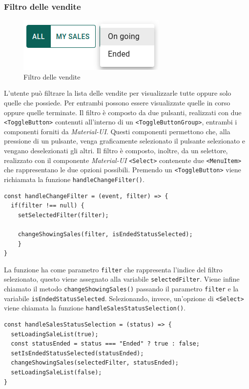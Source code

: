 \documentclass[a4paper]{article}
\begin{document}
        \subsubsection{Filtro delle vendite}
        \begin{figure}[ht]
          \includegraphics[scale=0.7]{saleFilter.png}
          \centering
          \caption{Filtro delle vendite}
          \centering
          \label{fig:salesFilter}
        \end{figure}
        L'utente può filtrare la lista delle vendite per visualizzarle tutte oppure solo quelle che possiede. Per entrambi possono essere visualizzate quelle in corso oppure quelle terminate.
        Il filtro è composto da due pulsanti, realizzati con due \verb|<ToggleButton>| contenuti all'interno di un \verb|<ToggleButtonGroup>|, entrambi i componenti forniti da \emph{Material-UI}. Questi componenti permettono che, alla pressione di un pulsante, venga graficamente selezionato il pulsante selezionato e vengano deselezionati gli altri.
        Il filtro è composto, inoltre, da un selettore, realizzato con il componente \emph{Material-UI} \verb|<Select>| contenente due \verb|<MenuItem>| che rappresentano le due opzioni possibili.
        Premendo un \verb|<ToggleButton>| viene richiamata la funzione \verb|handleChangeFilter()|.
\begin{lstlisting}[style=ES6, title={Funzione handleChangeFilter()}]
const handleChangeFilter = (event, filter) => {
  if(filter !== null) { 
    setSelectedFilter(filter);

    changeShowingSales(filter, isEndedStatusSelected);
    }
}\end{lstlisting}
        La funzione ha come parametro \verb|filter| che rappresenta l'indice del filtro selezionato, questo viene assegnato alla variabile \verb|selectedFilter|.
        Viene infine chiamato il metodo \verb|changeShowingSales()| passando il parametro \verb|filter| e la variabile \verb|isEndedStatusSelected|.
        \newline
        Selezionando, invece, un'opzione di \verb|<Select>| viene chiamata la funzione \verb|handleSalesStatusSelection()|.
\begin{lstlisting}[style=ES6, title={Funzione handleSalesStatusSelection()}]
const handleSalesStatusSelection = (status) => {
  setLoadingSaleList(true);
  const statusEnded = status === "Ended" ? true : false;
  setIsEndedStatusSelected(statusEnded);
  changeShowingSales(selectedFilter, statusEnded);
  setLoadingSaleList(false);
}\end{lstlisting}
\end{document}
